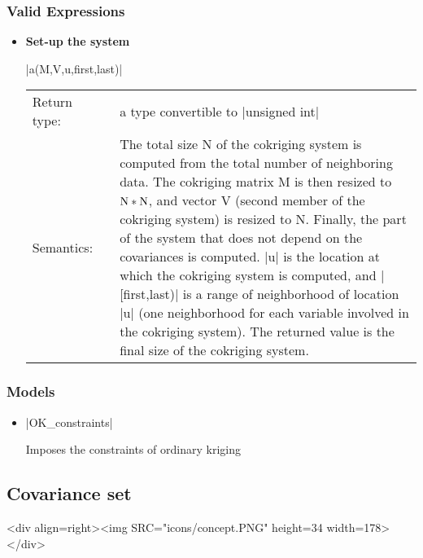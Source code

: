 \documentclass[12pt,twoside]{report}
\begin{document}
\htmlrule[CLEAR=all]  \subsubsection*{Valid Expressions}
\begin{itemize}
\item {\bf Set-up the system}

  |a(M,V,u,first,last)|
  
  \begin{tabular}[!h]{l p{1cm} p{10cm}}
    Return type: & & a type convertible to |unsigned int|\\
    Semantics: & & The total size N of the cokriging system is computed from the total number of neighboring data. The cokriging matrix M is then resized to $\rm{N}*\rm{N}$, and vector V (second member of the cokriging system) is resized to N. Finally, the part of the  system that does not depend on the covariances is computed. |u| is the location at which the cokriging system is computed, and |[first,last)| is a range of neighborhood of location |u| (one neighborhood for each variable involved in the cokriging system). The returned value is the final size of the cokriging system.\\
    
  \end{tabular}

\end{itemize}

\htmlrule[CLEAR=all]  \subsubsection*{Models}
\begin{itemize}
\item |OK_constraints|

Imposes the constraints of ordinary kriging 

\end{itemize}





%
\subsection{Covariance set}
\label{concept:covarianceset}
\begin{htmlonly}
<div align=right><img SRC="icons/concept.PNG" height=34 width=178></div>
\end{htmlonly}
\end{document}
